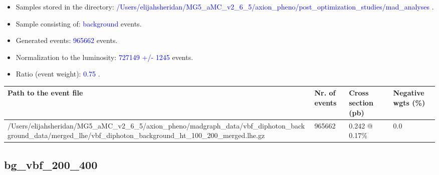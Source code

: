\documentclass[a4paper, 10pt]{article}
\begin{document}
\begin{itemize}
  \item Samples stored in the directory: \textcolor{blue}{/\-Users/\-elijahsheridan/\-MG5\_aMC\_v2\_6\_5/\-axion\_pheno/\-post\_optimization\_studies/\-mad\_analyses} .
   \item Sample consisting of: \textcolor{blue}{background}  events.
   \item Generated events: \textcolor{blue}{965662 }  events.
   \item Normalization to the luminosity: \textcolor{blue}{727149}\textcolor{blue}{ +/\-- }\textcolor{blue}{1245 }  events.
   \item Ratio (event weight): \textcolor{blue}{0.75 } .  
 
\end{itemize}
\begin{table}[H]
  \begin{center}
    \begin{tabular}{|m{55.0mm}|m{25.0mm}|m{30.0mm}|m{30.0mm}|}
      \hline
      {\cellcolor{yellow}         Path to the event file}& {\cellcolor{yellow}         Nr. of events}& {\cellcolor{yellow}         Cross section (pb)}& {\cellcolor{yellow}         Negative wgts (\%)}\\
      \hline
      {\cellcolor{white}          /\-Users/\-elijahsheridan/\-MG5\_aMC\_v2\_6\_5/\-axion\_pheno/\-madgraph\_data/\-vbf\_diphoton\_background\_data/\-merged\_lhe/\-vbf\_diphoton\_background\_ht\_100\_200\_merged.lhe.gz}& {\cellcolor{white}          965662}& {\cellcolor{white}          0.242 @ 0.17\%}& {\cellcolor{white}          0.0}\\
\hline
    \end{tabular}
  \end{center}
\end{table}

\subsection{ bg\_vbf\_200\_400}
\end{document}

